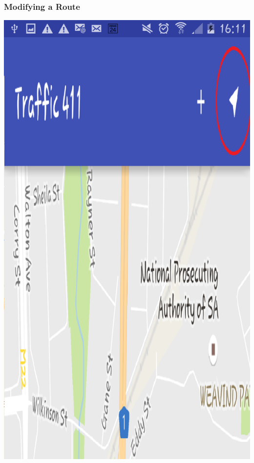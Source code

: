 \documentclass[a4paper,12pt]{article}
\begin{document}
\subsubsection{Modifying a Route}
\includegraphics[width=\textwidth]{images/MainScreen3.png}
\end{document}
